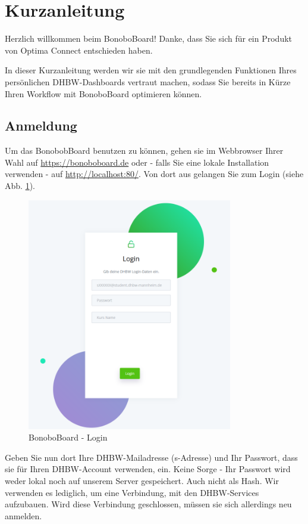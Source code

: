 \documentclass[a4paper,11pt]{scrartcl}
\begin{document}
\section{Kurzanleitung}\label{Kurzanleitung}
Herzlich willkommen beim BonoboBoard! Danke, dass Sie sich für ein Produkt von Optima Connect entschieden haben. 

\bigskip
In dieser Kurzanleitung werden wir sie mit den grundlegenden Funktionen Ihres persönlichen DHBW-Dashboards vertraut machen, sodass Sie bereits in Kürze Ihren Workflow mit BonoboBoard optimieren können.

\subsection{Anmeldung}
Um das BonobobBoard benutzen zu können, gehen sie im Webbrowser Ihrer Wahl auf \url{https://bonoboboard.de} oder - falls Sie eine lokale Installation verwenden - auf \url{http://localhost:80/}. Von dort aus gelangen Sie zum Login (siehe Abb. \ref{img:login}).

\begin{figure}[H]
	\begin{center}
		\includegraphics[width=0.8\textwidth]{login}
		\caption{BonoboBoard - Login}
		\label{img:login}
	\end{center}
\end{figure}
\noindent

Geben Sie nun dort Ihre DHBW-Mailadresse (s-Adresse) und Ihr Passwort, dass sie für Ihren DHBW-Account verwenden, ein. Keine Sorge - Ihr Passwort wird weder lokal noch auf unserem Server gespeichert. Auch nicht als Hash. Wir verwenden es lediglich, um eine Verbindung, mit den DHBW-Services aufzubauen. Wird diese Verbindung geschlossen, müssen sie sich allerdings neu anmelden.
\end{document}
